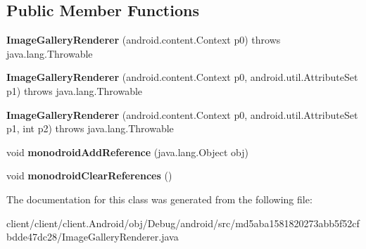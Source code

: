 \subsection*{Public Member Functions}
\begin{DoxyCompactItemize}
\item 
\hypertarget{classmd5aba1581820273abb5f52cfbdde47dc28_1_1ImageGalleryRenderer_a7b63bf8a1fcb832e472aa46cf82e9a45}{}{\bfseries Image\+Gallery\+Renderer} (android.\+content.\+Context p0)  throws java.\+lang.\+Throwable 	\label{classmd5aba1581820273abb5f52cfbdde47dc28_1_1ImageGalleryRenderer_a7b63bf8a1fcb832e472aa46cf82e9a45}

\item 
\hypertarget{classmd5aba1581820273abb5f52cfbdde47dc28_1_1ImageGalleryRenderer_a1396767375bbc07a6fb92cbefb1e61f7}{}{\bfseries Image\+Gallery\+Renderer} (android.\+content.\+Context p0, android.\+util.\+Attribute\+Set p1)  throws java.\+lang.\+Throwable 	\label{classmd5aba1581820273abb5f52cfbdde47dc28_1_1ImageGalleryRenderer_a1396767375bbc07a6fb92cbefb1e61f7}

\item 
\hypertarget{classmd5aba1581820273abb5f52cfbdde47dc28_1_1ImageGalleryRenderer_a0b85a7ff16ec413caed68d8f544e7d5c}{}{\bfseries Image\+Gallery\+Renderer} (android.\+content.\+Context p0, android.\+util.\+Attribute\+Set p1, int p2)  throws java.\+lang.\+Throwable 	\label{classmd5aba1581820273abb5f52cfbdde47dc28_1_1ImageGalleryRenderer_a0b85a7ff16ec413caed68d8f544e7d5c}

\item 
\hypertarget{classmd5aba1581820273abb5f52cfbdde47dc28_1_1ImageGalleryRenderer_a8faf532676e3b48a40564d8b4de77226}{}void {\bfseries monodroid\+Add\+Reference} (java.\+lang.\+Object obj)\label{classmd5aba1581820273abb5f52cfbdde47dc28_1_1ImageGalleryRenderer_a8faf532676e3b48a40564d8b4de77226}

\item 
\hypertarget{classmd5aba1581820273abb5f52cfbdde47dc28_1_1ImageGalleryRenderer_aa9f194be7dd8f8a519fb11737cf721b8}{}void {\bfseries monodroid\+Clear\+References} ()\label{classmd5aba1581820273abb5f52cfbdde47dc28_1_1ImageGalleryRenderer_aa9f194be7dd8f8a519fb11737cf721b8}

\end{DoxyCompactItemize}


The documentation for this class was generated from the following file\+:\begin{DoxyCompactItemize}
\item 
client/client/client.\+Android/obj/\+Debug/android/src/md5aba1581820273abb5f52cfbdde47dc28/Image\+Gallery\+Renderer.\+java\end{DoxyCompactItemize}
